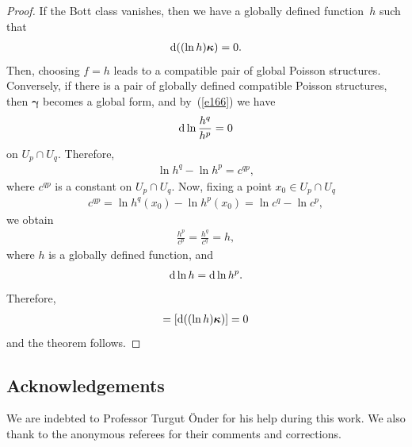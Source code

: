 \documentclass[10pt,a4paper]{amsart}
\numberwithin{equation}{section}
\begin{document}
\begin{proof}
If the Bott class vanishes, then we have a globally def\/ined function~$h$ such that
\begin{gather*}
{\rm d} ( ( \ln h ) \boldsymbol{\kappa } ) =0.
\end{gather*}
Then, choosing $f=h$ leads to a compatible pair of global Poisson structures. Conversely, if there is a pair of globally def\/ined compatible Poisson structures, then $\boldsymbol{\gamma }$ becomes a global form, and by~(\ref{e166}) we have
\begin{gather*}
{\rm d}\ln \frac{h^{q}}{h^{p}}=0
\end{gather*}
on $U_{p}\cap U_{q}$. Therefore,
\begin{gather*}
\ln h^{q}-\ln h^{p}=c^{qp},
\end{gather*}
where $c^{qp}$ is a constant on $U_{p}\cap U_{q}$. Now, f\/ixing a point $x_{0}\in U_{p}\cap U_{q}$
\begin{gather*}
c^{qp}=\ln h^{q} ( x_{0} ) -\ln h^{p} ( x_{0} ) =\ln c^{q}-\ln c^{p},
\end{gather*}
we obtain
\begin{gather*}
\frac{h^{p}}{c^{p}}=\frac{h^{q}}{c^{q}}=h,
\end{gather*}
where $h$ is a globally def\/ined function, and
\begin{gather*}
{\rm d}\ln h={\rm d}\ln h^{p}.
\end{gather*}
Therefore,
\begin{gather*}
 [ \boldsymbol{h}_{1}\wedge \boldsymbol{c}_{1} ] = [ {\rm d} (( \ln h) \boldsymbol{\kappa })] =0 \label{e173}
\end{gather*}
and the theorem follows.
\end{proof}


\subsection*{Acknowledgements}
We are indebted to Professor Turgut \"{O}nder for his help during this work. We also thank to the anonymous referees for their comments and corrections.

\end{document}
